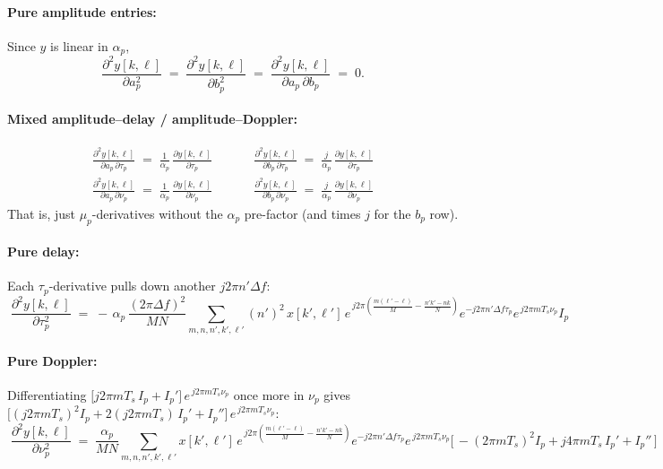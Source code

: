 \documentclass[11pt]{article}
\begin{document}
\paragraph{Pure amplitude entries:}
Since $y$ is linear in $\alpha_p$,
\begin{equation}
  \boxed{\;
  \frac{\partial^2 y[k,\ell]}{\partial a_p^2}
  \;=\;
  \frac{\partial^2 y[k,\ell]}{\partial b_p^2}
  \;=\;
  \frac{\partial^2 y[k,\ell]}{\partial a_p\,\partial b_p}
  \;=\; 0.
  \;}
\end{equation}

\paragraph{Mixed amplitude--delay / amplitude--Doppler:}
\begin{align}
  \boxed{\;
  \frac{\partial^2 y[k,\ell]}{\partial a_p\,\partial \tau_p}
  \;=\; \frac{1}{\alpha_p}\,\frac{\partial y[k,\ell]}{\partial \tau_p}
  \;}
  &\qquad
  \boxed{\;
  \frac{\partial^2 y[k,\ell]}{\partial b_p\,\partial \tau_p}
  \;=\; \frac{j}{\alpha_p}\,\frac{\partial y[k,\ell]}{\partial \tau_p}
  \;}
  \\[6pt]
  \boxed{\;
  \frac{\partial^2 y[k,\ell]}{\partial a_p\,\partial \nu_p}
  \;=\; \frac{1}{\alpha_p}\,\frac{\partial y[k,\ell]}{\partial \nu_p}
  \;}
  &\qquad
  \boxed{\;
  \frac{\partial^2 y[k,\ell]}{\partial b_p\,\partial \nu_p}
  \;=\; \frac{j}{\alpha_p}\,\frac{\partial y[k,\ell]}{\partial \nu_p}
  \;}
\end{align}
That is, just $\mu_p$-derivatives without the $\alpha_p$ pre-factor (and
times $j$ for the $b_p$ row).

\paragraph{Pure delay:}
Each $\tau_p$-derivative pulls down another $j2\pi n'\Delta f$:
\begin{equation}
  \boxed{\;
  \frac{\partial^2 y[k,\ell]}{\partial \tau_p^2}
  \;=\; -\,\alpha_p\,\frac{(2\pi\Delta f)^2}{MN}
        \sum_{m,n,n',k',\ell'} (n')^2\,
        x[k',\ell']\,
        e^{\,j2\pi\!\left(\frac{m(\ell'-\ell)}{M}-\frac{n'k'-nk}{N}\right)}
        e^{-j2\pi n'\Delta f\tau_p}
        e^{\,j2\pi m T_s\nu_p}
        I_p
  \;}
\end{equation}

\paragraph{Pure Doppler:}
Differentiating
$\bigl[j2\pi m T_s\,I_p + I_p'\bigr]\,e^{\,j2\pi m T_s\nu_p}$ once more
in $\nu_p$ gives
$\bigl[(j2\pi m T_s)^2 I_p + 2(j2\pi m T_s)\,I_p' + I_p''\bigr]\,e^{\,j2\pi m T_s\nu_p}$:
\begin{equation}
  \boxed{\;
  \frac{\partial^2 y[k,\ell]}{\partial \nu_p^2}
  \;=\; \frac{\alpha_p}{MN}
        \sum_{m,n,n',k',\ell'}
        x[k',\ell']\,
        e^{\,j2\pi\!\left(\frac{m(\ell'-\ell)}{M}-\frac{n'k'-nk}{N}\right)}
        e^{-j2\pi n'\Delta f\tau_p}
        e^{\,j2\pi m T_s\nu_p}
        \bigl[\,-(2\pi m T_s)^2 I_p + j4\pi m T_s\,I_p' + I_p''\,\bigr]
  \;}
\end{equation}
\end{document}
